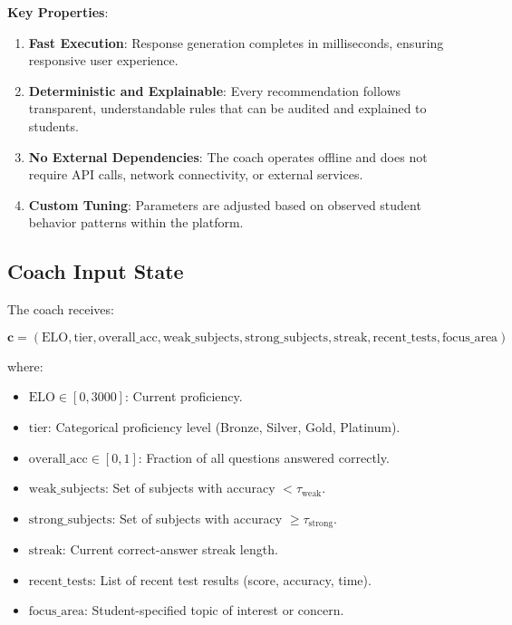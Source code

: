 \documentclass[sigconf,authordraft,twoside]{acmart}
\begin{document}
\textbf{Key Properties}:
\begin{enumerate}
\item \textbf{Fast Execution}: Response generation completes in milliseconds, ensuring responsive user experience.

\item \textbf{Deterministic and Explainable}: Every recommendation follows transparent, understandable rules that can be audited and explained to students.

\item \textbf{No External Dependencies}: The coach operates offline and does not require API calls, network connectivity, or external services.

\item \textbf{Custom Tuning}: Parameters are adjusted based on observed student behavior patterns within the platform.
\end{enumerate}

\subsection{Coach Input State}

The coach receives:

\begin{equation}
\mathbf{c} = (\text{ELO}, \text{tier}, \text{overall\_acc}, \text{weak\_subjects}, \text{strong\_subjects}, \text{streak}, \text{recent\_tests}, \text{focus\_area})
\end{equation}

where:
\begin{itemize}
\item $\text{ELO} \in [0, 3000]$: Current proficiency.
\item $\text{tier}$: Categorical proficiency level (Bronze, Silver, Gold, Platinum).
\item $\text{overall\_acc} \in [0, 1]$: Fraction of all questions answered correctly.
\item $\text{weak\_subjects}$: Set of subjects with accuracy $< \tau_{\text{weak}}$.
\item $\text{strong\_subjects}$: Set of subjects with accuracy $\geq \tau_{\text{strong}}$.
\item $\text{streak}$: Current correct-answer streak length.
\item $\text{recent\_tests}$: List of recent test results (score, accuracy, time).
\item $\text{focus\_area}$: Student-specified topic of interest or concern.
\end{itemize}
\end{document}
